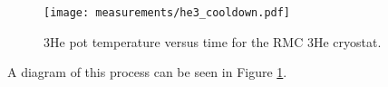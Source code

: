 \begin{figure}
    \centering
    \texttt{[image: measurements/he3\_cooldown.pdf]}
    \caption{3He pot temperature versus time for the RMC 3He cryostat.}
    \label{fig:he3_cooldown}
\end{figure}

A diagram of this process can be seen in Figure \ref{fig:he3_cooldown}.
